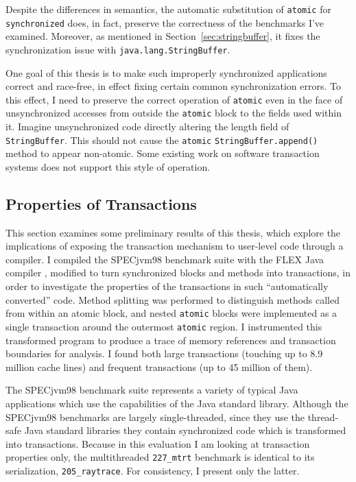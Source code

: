 \documentclass[12pt,twoside]{article}
\newcommand{\subsecput}[2]{\subsection{#2}\label{sec:#1}}
\newcommand{\secref}[1]         {Section~\ref{sec:#1}}
\begin{document}
Despite the differences in semantics, the automatic substitution of
{\tt atomic} for {\tt synchronized} does, in fact, preserve the
correctness of the benchmarks I've examined.  Moreover, as
mentioned in \secref{stringbuffer}, it
fixes the synchronization issue with {\tt java.lang.StringBuffer}.

One goal of this thesis is to make such improperly synchronized
applications correct and race-free, in effect fixing certain common
synchronization errors.  To this effect, I need to preserve the
correct operation of {\tt atomic} even in the face of unsynchronized
accesses from outside the {\tt atomic} block to the fields used within
it.  Imagine unsynchronized code directly altering the length field of
{\tt StringBuffer}.  This should not cause the {\tt atomic}
{\tt StringBuffer.append()} method to appear non-atomic.
Some existing work on software transaction systems \cite{HarrisFr03}
does not support this style of operation.

\subsecput{properties}{Properties of Transactions}
This section examines some preliminary results of this thesis, which
explore the implications of exposing the transaction
mechanism to user-level code through a compiler.
I compiled the SPECjvm98 benchmark suite with the FLEX Java compiler
\cite{Flex},
modified to turn synchronized blocks and methods into transactions,
in order to investigate the properties of the transactions in such
``automatically converted'' code.
Method splitting was performed to distinguish methods called from
within an atomic block, and nested
\texttt{atomic} blocks were implemented as a single
transaction around the outermost \texttt{atomic} region.  I
instrumented this transformed program to produce a trace of
memory references and transaction boundaries for analysis.
I found both large
transactions (touching up to 8.9 million cache lines) and frequent
transactions (up to 45 million of them).

The SPECjvm98 benchmark suite represents a variety of typical Java
applications which use the capabilities of the Java standard library.
Although the SPECjvm98 benchmarks are largely single-threaded, since
they use the thread-safe Java standard libraries they contain
synchronized code which is transformed into transactions.  Because in
this evaluation I am looking at transaction properties only, the
multithreaded \texttt{227\_mtrt} benchmark is identical to its
serialization, \texttt{205\_raytrace}.  For consistency, I present
only the latter.
\end{document}
